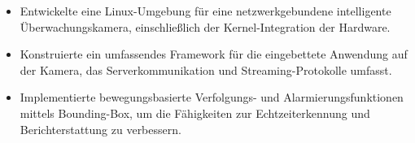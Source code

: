 \begin{minipage}{\linewidth}
\begin{itemize}
  \item Entwickelte eine Linux-Umgebung für eine netzwerkgebundene intelligente Überwachungskamera, einschließlich der Kernel-Integration der Hardware.
  \item Konstruierte ein umfassendes Framework für die eingebettete Anwendung auf der Kamera, das Serverkommunikation und Streaming-Protokolle umfasst.
  \item Implementierte bewegungsbasierte Verfolgungs- und Alarmierungsfunktionen mittels Bounding-Box, um die Fähigkeiten zur Echtzeiterkennung und Berichterstattung zu verbessern.
\end{itemize}
\end{minipage}
\divider
